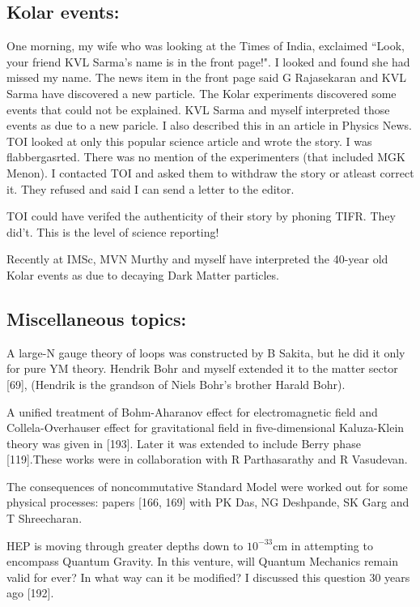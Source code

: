 \subsection*{Kolar events:}
\vskip -8pt
One morning, my wife who was looking at the Times of India, exclaimed 
``Look, your friend KVL Sarma's name is in the front page!". I looked and 
found she had missed my name. The news item in the front page said G 
Rajasekaran and KVL Sarma have discovered a new particle. The Kolar 
experiments discovered some events that could not be explained. KVL 
Sarma and myself interpreted those events as due to a new paricle. I 
also described this in an article in Physics News. TOI looked at only 
this po\-pular science article and wrote the story. I was flabbergasrted. 
There was no mention of the experimenters (that included MGK Menon). I 
contacted TOI and asked them to withdraw the story or atleast correct 
it. They refused and said I can send a letter to the editor.

TOI could have verifed the authenticity of their story by pho\-ning TIFR. 
They did't. This is the level of science repor\-ting!

Recently at IMSc, MVN Murthy and myself have interpreted the 40-year old 
Kolar events as due to decaying Dark Matter parti\-cles.


\subsection*{Miscellaneous topics:}

A large-N gauge theory of loops was constructed by B Sakita, but he did 
it only for pure YM theory. Hendrik Bohr and myself extended it to the 
matter sector [69], (Hendrik is the grandson of Niels Bohr's brother 
Harald Bohr).

A unified treatment of Bohm-Aharanov effect for electromagnetic field 
and Collela-Overhauser effect for gravitational field in 
five-dimensional Kaluza-Klein theory was given in [193]. Later it was 
extended to include Berry phase [119].These works were in collaboration 
with R Parthasarathy and R Vasudevan.


The consequences of noncommutative Standard Model were worked out for 
some physical processes: papers [166, 169] with PK Das, NG Deshpande, SK 
Garg and T Shreecharan.


HEP is moving through greater depths down to $10^{-33}$cm in attempting 
to encompass Quantum Gravity. In this venture, will Quantum Mechanics 
remain valid for ever? In what way can it be modified? I discussed this 
question 30 years ago [192].

